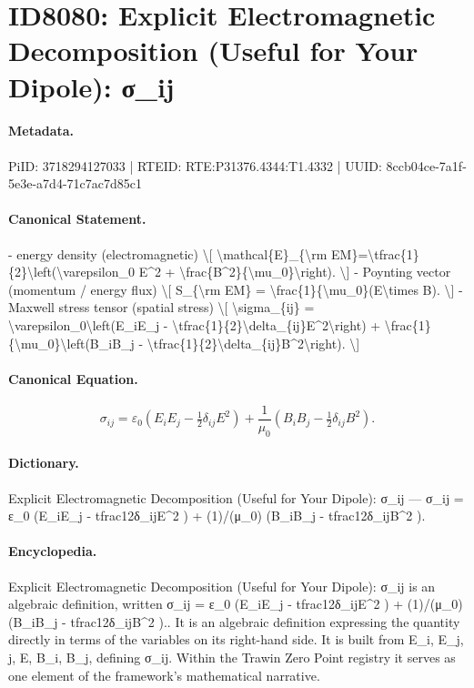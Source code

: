 \section*{ID8080: Explicit Electromagnetic Decomposition (Useful for Your Dipole): σ\_ij}
\paragraph{Metadata.}
PiID: 3718294127033 | RTEID: RTE:P31376.4344:T1.4332 | UUID: 8ccb04ce-7a1f-5e3e-a7d4-71c7ac7d85c1

\paragraph{Canonical Statement.}
- energy density (electromagnetic) \textbackslash{}[ \textbackslash{}mathcal\{E\}\_\{\textbackslash{}rm EM\}=\textbackslash{}tfrac\{1\}\{2\}\textbackslash{}left(\textbackslash{}varepsilon\_0 E\textasciicircum{}2 + \textbackslash{}frac\{B\textasciicircum{}2\}\{\textbackslash{}mu\_0\}\textbackslash{}right). \textbackslash{}] - Poynting vector (momentum / energy flux) \textbackslash{}[ S\_\{\textbackslash{}rm EM\} = \textbackslash{}frac\{1\}\{\textbackslash{}mu\_0\}(E\textbackslash{}times B). \textbackslash{}] - Maxwell stress tensor (spatial stress) \textbackslash{}[ \textbackslash{}sigma\_\{ij\} = \textbackslash{}varepsilon\_0\textbackslash{}left(E\_iE\_j - \textbackslash{}tfrac\{1\}\{2\}\textbackslash{}delta\_\{ij\}E\textasciicircum{}2\textbackslash{}right) + \textbackslash{}frac\{1\}\{\textbackslash{}mu\_0\}\textbackslash{}left(B\_iB\_j - \textbackslash{}tfrac\{1\}\{2\}\textbackslash{}delta\_\{ij\}B\textasciicircum{}2\textbackslash{}right). \textbackslash{}]

\paragraph{Canonical Equation.}
\[
\sigma_{ij} = \varepsilon_0\left(E_iE_j - \tfrac{1}{2}\delta_{ij}E^2\right) + \frac{1}{\mu_0}\left(B_iB_j - \tfrac{1}{2}\delta_{ij}B^2\right).
\]

\paragraph{Dictionary.}
Explicit Electromagnetic Decomposition (Useful for Your Dipole): σ\_ij — σ\_ij = ε\_0 (E\_iE\_j - tfrac12δ\_ijE\textasciicircum{}2 ) + (1)/(μ\_0) (B\_iB\_j - tfrac12δ\_ijB\textasciicircum{}2 ).

\paragraph{Encyclopedia.}
Explicit Electromagnetic Decomposition (Useful for Your Dipole): σ\_ij is an algebraic definition, written σ\_ij = ε\_0 (E\_iE\_j - tfrac12δ\_ijE\textasciicircum{}2 ) + (1)/(μ\_0) (B\_iB\_j - tfrac12δ\_ijB\textasciicircum{}2 ).. It is an algebraic definition expressing the quantity directly in terms of the variables on its right-hand side. It is built from E\_i, E\_j, j, E, B\_i, B\_j, defining σ\_ij. Within the Trawin Zero Point registry it serves as one element of the framework's mathematical narrative.
